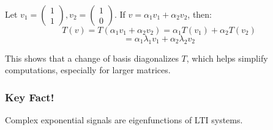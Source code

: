 \begin{example}
    Let $v_1 = \begin{pmatrix} 1 \\ 1 \end{pmatrix}, v_2 = \begin{pmatrix} 1 \\ 0 \end{pmatrix}$. If $v = \alpha_1 v_1 + \alpha_2 v_2$, then:
    \[
    T(v) = T(\alpha_1 v_1 + \alpha_2 v_2) = \alpha_1 T(v_1) + \alpha_2 T(v_2)
    \]
    \[
    = \alpha_1 \lambda_1 v_1 + \alpha_2 \lambda_2 v_2
    \]
\end{example}

\begin{intuition}
    This shows that a change of basis diagonalizes $T$, which helps simplify computations, especially for larger matrices.
\end{intuition}

\subsubsection{Key Fact!}
\begin{definition}
    Complex exponential signals are eigenfunctions of LTI systems.

\end{definition}